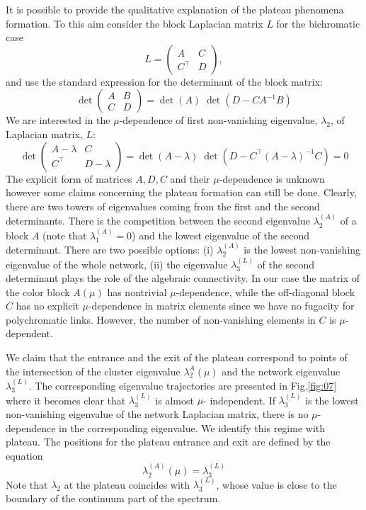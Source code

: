 \documentclass[aps,12pt]{revtex4}
\newcommand{\fig}[1]{Fig.\ref{#1}}
\newcommand{\be}{\begin{equation}}
\newcommand{\ee}{\end{equation}}
\begin{document}
It is possible to provide the qualitative explanation of the plateau phenomena formation. To this aim consider the block Laplacian matrix $L$ for the bichromatic case
\be
L=\left(\begin{array}{cc}
A & C \\
C^{\top} & D
\end{array}\right),
\ee
and use the standard expression for the determinant of the block matrix:
\be
\det\left(\begin{array}{cc}
A & B \\
C & D
\end{array}\right) = \det(A)\; \det\left(D - CA^{-1}B\right)
\ee
We are interested in the $\mu$-dependence of first non-vanishing eigenvalue, $\lambda_2$, of Laplacian matrix, $L$:
\be
\det\left(\begin{array}{cc}
A - \lambda & C \\
C^{\top} & D -\lambda
\end{array}\right) = \det(A -\lambda)\; \det\left(D- C^{\top}(A -\lambda)^{-1}C\right) =0
\ee
The explicit form of matrices $A,D,C$ and their $\mu$-dependence is unknown however some claims concerning the plateau formation can still be done. Clearly, there are two towers of eigenvalues coming from the first and the second determinants. There is the competition between the second eigenvalue $\lambda_2^{(A)}$ of a block $A$ (note that $\lambda_1^{(A)}=0$) and the lowest eigenvalue of the second determinant. There are two possible options: (i) $\lambda_2^{(A)}$ is the lowest non-vanishing eigenvalue of the whole network, (ii) the eigenvalue  $\lambda_3^{(L)}$ of the second determinant plays the role of the algebraic connectivity. In our case the matrix of the color block $A(\mu)$ has nontrivial $\mu$-dependence, while the off-diagonal block $C$ has no explicit $\mu$-dependence in matrix elements since we have no fugacity for polychromatic links. However, the number of non-vanishing elements in $C$ is $\mu$-dependent.

We claim that the entrance and the exit of the plateau correspond to points of the intersection of the cluster eigenvalue $\lambda_2^A(\mu)$ and the network eigenvalue $\lambda_3^{(L)}$. The corresponding eigenvalue trajectories are presented in \fig{fig:07} where it becomes clear that $\lambda_3^{(L)}$ is almost $\mu$- independent. If $\lambda_3^{(L)}$ is the lowest non-vanishing eigenvalue of the network Laplacian matrix, there is no $\mu$-dependence in the corresponding eigenvalue. We identify this regime with plateau. The positions for the plateau entrance and exit are defined by the equation
\be
\lambda_2^{(A)}(\mu) = \lambda_3^{(L)}
\ee
Note that $\lambda_2$ at the plateau coincides with $\lambda_3^{(L)}$, whose value is close to the boundary of the continuum part of the spectrum.
\end{document}

